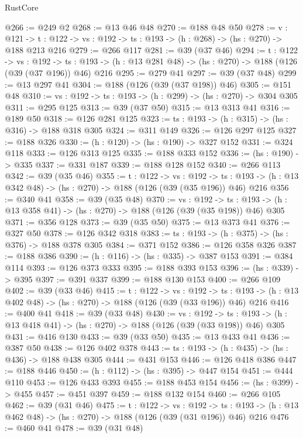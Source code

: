 \begin{lexlean}{RustCore}
\begin{coremodule}
@266 := @249 @2
@268 := @13 @46 @48
@270 := @188 @48 @50
@278 := {v : @121} ->
  {t : @122} -> {vs : @192} -> {ts : @193} -> (h : @268) -> (hs : @270) -> @188 @213 @216
@279 := @266 @117
@281 := @39 (@37 @46)
@294 := {t : @122} ->
  {vs : @192} ->
  {ts : @193} -> (h : @13 @281 @48) -> (hs : @270) -> @188 (@126 (@39 (@37 @196)) @46) @216
@295 := @279 @41
@297 := @39 (@37 @48)
@299 := @13 @297 @41
@304 := @188 (@126 (@39 (@37 @198)) @46)
@305 := @151 @48
@310 := {vs : @192} -> {ts : @193} -> (h : @299) -> (hs : @270) -> @304 @305
@311 := @295 @125
@313 := @39 (@37 @50)
@315 := @13 @313 @41
@316 := @189 @50
@318 := @126 @281 @125
@323 := {ts : @193} -> (h : @315) -> (hs : @316) -> @188 @318 @305
@324 := @311 @149
@326 := @126 @297 @125
@327 := @188 @326
@330 := (h : @120) -> (hs : @190) -> @327 @152
@331 := @324 @118
@333 := @126 @313 @125
@335 := @188 @333 @152
@336 := (hs : @190) -> @335
@337 := @331 @187
@339 := @188 @128 @152
@340 := @266 @113
@342 := @39 (@35 @46)
@355 := {t : @122} ->
  {vs : @192} ->
  {ts : @193} -> (h : @13 @342 @48) -> (hs : @270) -> @188 (@126 (@39 (@35 @196)) @46) @216
@356 := @340 @41
@358 := @39 (@35 @48)
@370 := {vs : @192} ->
  {ts : @193} -> (h : @13 @358 @41) -> (hs : @270) -> @188 (@126 (@39 (@35 @198)) @46) @305
@371 := @356 @128
@373 := @39 (@35 @50)
@375 := @13 @373 @41
@376 := @327 @50
@378 := @126 @342 @318
@383 := {ts : @193} -> (h : @375) -> (hs : @376) -> @188 @378 @305
@384 := @371 @152
@386 := @126 @358 @326
@387 := @188 @386
@390 := (h : @116) -> (hs : @335) -> @387 @153
@391 := @384 @114
@393 := @126 @373 @333
@395 := @188 @393 @153
@396 := (hs : @339) -> @395
@397 := @391 @337
@399 := @188 @130 @153
@400 := @266 @109
@402 := @39 (@33 @46)
@415 := {t : @122} ->
  {vs : @192} ->
  {ts : @193} -> (h : @13 @402 @48) -> (hs : @270) -> @188 (@126 (@39 (@33 @196)) @46) @216
@416 := @400 @41
@418 := @39 (@33 @48)
@430 := {vs : @192} ->
  {ts : @193} -> (h : @13 @418 @41) -> (hs : @270) -> @188 (@126 (@39 (@33 @198)) @46) @305
@431 := @416 @130
@433 := @39 (@33 @50)
@435 := @13 @433 @41
@436 := @387 @50
@438 := @126 @402 @378
@443 := {ts : @193} -> (h : @435) -> (hs : @436) -> @188 @438 @305
@444 := @431 @153
@446 := @126 @418 @386
@447 := @188 @446
@450 := (h : @112) -> (hs : @395) -> @447 @154
@451 := @444 @110
@453 := @126 @433 @393
@455 := @188 @453 @154
@456 := (hs : @399) -> @455
@457 := @451 @397
@459 := @188 @132 @154
@460 := @266 @105
@462 := @39 (@31 @46)
@475 := {t : @122} ->
  {vs : @192} ->
  {ts : @193} -> (h : @13 @462 @48) -> (hs : @270) -> @188 (@126 (@39 (@31 @196)) @46) @216
@476 := @460 @41
@478 := @39 (@31 @48)

\end{coremodule}
\end{lexlean}
